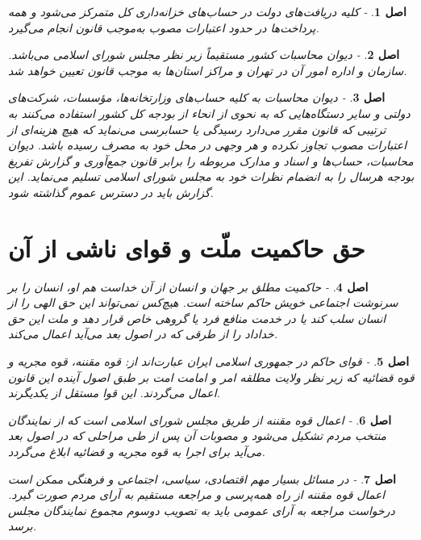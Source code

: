\documentclass[12pt]{article}
\newtheorem{asl}{اصل}
\begin{document}
\begin{asl}- 
کلیه دریافت‌های دولت در حساب‌های خزانه‌داری کل متمرکز می‌شود و همه پرداخت‌ها در حدود اعتبارات مصوب به‌موجب قانون انجام می‌گیرد.
\end{asl}

\begin{asl}- 
دیوان محاسبات کشور مستقیماً زیر نظر مجلس شورای اسلامی می‌باشد. سازمان و اداره امور آن در تهران و مراکز استان‌ها به موجب قانون تعیین خواهد شد.
\end{asl}

\begin{asl}- 
دیوان محاسبات به کلیه حساب‌های وزارتخانه‌ها، مؤسسات‌، شرکت‌های دولتی و سایر دستگاه‌هایی که به نحوی از انحاء از بودجه کل کشور استفاده می‌کنند به ترتیبی که قانون مقرر می‌دارد رسیدگی یا حسابرسی می‌نماید که هیچ هزینه‌ای از اعتبارات مصوب تجاوز نکرده و هر وجهی در محل خود به مصرف رسیده باشد. دیوان محاسبات‌، حساب‌ها و اسناد و مدارک مربوطه را برابر قانون جمع‌آوری و گزارش تفریغ بودجه هرسال را به انضمام نظرات خود به مجلس شورای اسلامی تسلیم می‌نماید. این گزارش باید در دسترس عموم گذاشته شود.
\end{asl}

\section{حق حاکمیت ملّت و قوای ناشی از آن‌}
\begin{asl}- 
حاکمیت مطلق بر جهان و انسان از آن خداست هم او، انسان را بر سرنوشت اجتماعی خویش حاکم ساخته است. هیچ‌کس نمی‌تواند این حق الهی را از انسان سلب کند یا در خدمت ‌منافع فرد یا گروهی خاص قرار دهد و ملت این حق خداداد را از طرقی که در اصول بعد می‌آید اعمال می‌کند.
\end{asl}

\begin{asl}- 
قوای حاکم در جمهوری اسلامی ایران عبارت‌اند از: قوه مقننه‌، قوه مجریه و قوه قضائیه که زیر نظر ولایت مطلقه امر و امامت امت بر طبق اصول آینده این قانون اعمال می‌گردند. این قوا مستقل از یکدیگرند.
\end{asl}

\begin{asl}- 
اعمال قوه مقننه از طریق مجلس شورای اسلامی است که از نمایندگان منتخب مردم تشکیل می‌شود و مصوبات آن پس از طی مراحلی که در اصول بعد می‌آید برای اجرا به قوه مجریه و قضائیه ابلاغ می‌گردد.
\end{asl}

\begin{asl}- 
در مسائل بسیار مهم اقتصادی‌، سیاسی‌، اجتماعی ‌و فرهنگی ممکن است اعمال قوه مقننه از راه همه‌پرسی و مراجعه مستقیم به آرای مردم صورت گیرد. درخواست مراجعه به آرای عمومی باید به تصویب دوسوم مجموع نمایندگان مجلس برسد.
\end{asl}
\end{document}
